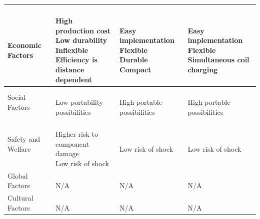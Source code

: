 \documentclass[12pt]{article}
\begin{document}
\begin{table}[h!]
\begin{tabular}{| l | l | l | l |}
\parbox{0.17\linewidth}{\raggedleft \hfill\\ Economic Factors\\} &
\parbox{0.240\linewidth}{\hfill \\
High production cost\\
Low durability \\
Inflexible\\
Efficiency is distance dependent
\\} & 
\parbox{0.240\linewidth}{\hfill \\
Easy implementation\\
Flexible\\
Durable\\
Compact
\\} & \parbox{0.240\linewidth}{\hfill \\
Easy implementation\\
Flexible\\
Simultaneous coil charging
\\}\\ \hline
\parbox{0.17\linewidth}{\raggedleft Social Factors} & 
\parbox{0.240\linewidth}{\hfill \\
Low portability possibilities
\\} & 
\parbox{0.240\linewidth}{\hfill \\
High portable possibilities
\\} & \parbox{0.240\linewidth}{\hfill \\
High portable possibilities
\\}\\ \hline
\parbox{0.17\linewidth}{\raggedleft Safety and Welfare} & 
\parbox{0.240\linewidth}{\hfill \\
Higher risk to component damage\\
Low risk of shock
\\} & 
\parbox{0.240\linewidth}{\hfill \\
Low risk of shock
\\} & \parbox{0.240\linewidth}{\hfill \\
Low risk of shock
\\}\\ \hline
\parbox{0.17\linewidth}{\raggedleft Global Factors} & 
\parbox{0.240\linewidth}{\hfill \\
N/A
\\} & 
\parbox{0.240\linewidth}{\hfill \\
N/A
\\} & \parbox{0.240\linewidth}{\hfill \\
N/A
\\}\\ \hline
\parbox{0.17\linewidth}{\raggedleft Cultural Factors} & 
\parbox{0.240\linewidth}{\hfill \\
N/A
\\} & 
\parbox{0.240\linewidth}{\hfill \\
N/A
\\} & \parbox{0.240\linewidth}{\hfill \\
N/A
\\}\\ \hline
\end{tabular}
\end{table}
\end{document}
